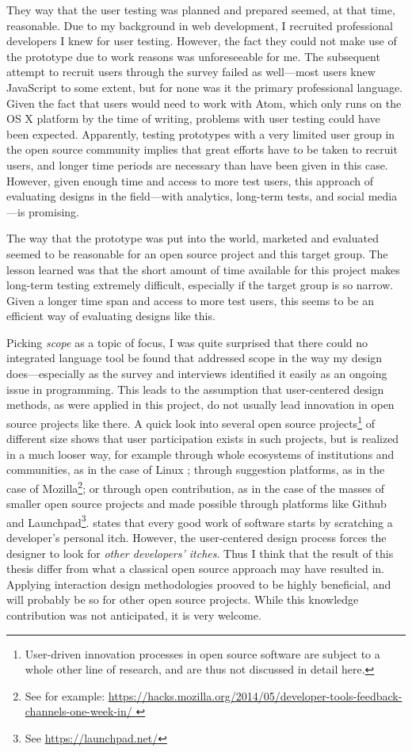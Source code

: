 They way that the user testing was planned and prepared seemed, at that
time, reasonable. Due to my background in web development, I recruited
professional developers I knew for user testing. However, the fact they
could not make use of the prototype due to work reasons was
unforeseeable for me. The subsequent attempt to recruit users through
the survey failed as well—most users knew JavaScript to some extent, but
for none was it the primary professional language. Given the fact that
users would need to work with Atom, which only runs on the OS X platform
by the time of writing, problems with user testing could have been
expected. Apparently, testing prototypes with a very limited user group
in the open source community implies that great efforts have to be taken
to recruit users, and longer time periods are necessary than have been
given in this case. However, given enough time and access to more test
users, this approach of evaluating designs in the field—with analytics,
long-term tests, and social media—is promising.

The way that the prototype was put into the world, marketed and
evaluated seemed to be reasonable for an open source project and this
target group. The lesson learned was that the short amount of time
available for this project makes long-term testing extremely difficult,
especially if the target group is so narrow. Given a longer time span
and access to more test users, this seems to be an efficient way of
evaluating designs like this.

Picking \emph{scope} as a topic of focus, I was quite surprised that
there could no integrated language tool be found that addressed scope in
the way my design does—especially as the survey and interviews
identified it easily as an ongoing issue in programming. This leads to
the assumption that user-centered design methods, as were applied in
this project, do not usually lead innovation in open source projects
like there. A quick look into several open source
projects\footnote{User-driven innovation processes in open source software are subject to a whole other line of research, and are thus not discussed in detail here.}
of different size shows that user participation exists in such projects,
but is realized in a much looser way, for example through whole
ecosystems of institutions and communities, as in the case of Linux
\cite{raymond2}; through suggestion platforms, as in the case of
Mozilla\footnote{See for example: \url{https://hacks.mozilla.org/2014/05/developer-tools-feedback-channels-one-week-in/
}}; or through open contribution, as in the case of the masses of
smaller open source projects and made possible through platforms like
Github and Launchpad\footnote{See \url{https://launchpad.net/}}.
 states that every good work of software starts by
scratching a developer's personal itch. However, the user-centered
design process forces the designer to look for \emph{other developers’
itches}. Thus I think that the result of this thesis differ from what a
classical open source approach may have resulted in. Applying
interaction design methodologies prooved to be highly beneficial, and
will probably be so for other open source projects. While this knowledge
contribution was not anticipated, it is very welcome.

